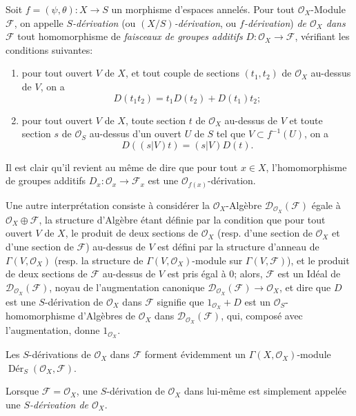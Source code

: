 \begin{env}[16.5.1]
\label{IV.16.5.1}
Soit $f=(\psi,\theta):X\to S$ un morphisme d'espaces annelés. Pour tout
$\mathcal{O}_X$-Module $\mathscr{F}$, on appelle \emph{$S$-dérivation}
(ou \emph{$(X/S)$-dérivation}, ou \emph{$f$-dérivation}) \emph{de
$\mathcal{O}_X$ dans $\mathscr{F}$} tout homomorphisme de \emph{faisceaux de
groupes additifs} $D:\mathcal{O}_X\to\mathscr{F}$, vérifiant les conditions
suivantes:
\begin{enumerate}
\item[(a)] pour tout ouvert $V$ de $X$, et tout couple de sections
$(t_1,t_2)$ de $\mathcal{O}_X$ au-dessus de $V$, on a
\[
  D(t_1t_2)=t_1D(t_2)+D(t_1)t_2;
  \tag{16.5.1.1}
  \label{IV.16.5.1.1}
\]
\item[(b)] pour tout ouvert $V$ de $X$, toute section $t$ de $\mathcal{O}_X$
au-dessus de $V$ et toute section $s$ de $\mathcal{O}_S$ au-dessus d'un ouvert
$U$ de $S$ tel que $V\subset f^{-1}(U)$, on a
\[
  D((s|V)t)=(s|V)D(t).
  \tag{16.5.1.2}
  \label{IV.16.5.1.2}
\]
\end{enumerate}
Il est clair qu'il revient au même de dire que pour tout $x\in X$,
l'homomorphisme de groupes additifs
$D_x:\mathcal{O}_x\to\mathscr{F}_x$ est une
$\mathcal{O}_{f(x)}$-dérivation.

Une autre interprétation consiste à considérer la $\mathcal{O}_X$-Algèbre
$\mathscr{D}_{\mathcal{O}_X}(\mathscr{F})$ égale à
$\mathcal{O}_X\oplus\mathscr{F}$, la structure d'Algèbre étant définie par la
condition que pour tout ouvert $V$ de $X$, le produit de deux sections de
$\mathcal{O}_X$ (resp. d'une section de $\mathcal{O}_X$ et d'une section de
$\mathscr{F}$) au-dessus de $V$ est défini par la structure d'anneau de
$\Gamma(V,\mathcal{O}_X)$ (resp. la structure de
$\Gamma(V,\mathcal{O}_X)$-module sur $\Gamma(V,\mathscr{F})$), et le produit de
deux sections de $\mathscr{F}$ au-dessus de $V$ est pris égal à 0; alors,
$\mathscr{F}$ est un Idéal de
$\mathscr{D}_{\mathcal{O}_X}(\mathscr{F})$, noyau de l'augmentation canonique
$\mathscr{D}_{\mathcal{O}_X}(\mathscr{F})\to\mathcal{O}_X$, et dire que $D$
est une $S$-dérivation de $\mathcal{O}_X$ dans $\mathscr{F}$ signifie que
$1_{\mathcal{O}_X}+D$ est un $\mathcal{O}_S$-homomorphisme d'Algèbres de
$\mathcal{O}_X$ dans $\mathscr{D}_{\mathcal{O}_X}(\mathscr{F})$, qui, composé
avec l'augmentation, donne $1_{\mathcal{O}_X}$.

Les $S$-dérivations de $\mathcal{O}_X$ dans $\mathscr{F}$ forment évidemment
un $\Gamma(X,\mathcal{O}_X)$-module
$\operatorname{Dér}_S(\mathcal{O}_X,\mathscr{F})$.

Lorsque $\mathscr{F}=\mathcal{O}_X$, une $S$-dérivation de $\mathcal{O}_X$ dans
lui-même est simplement appelée une \emph{$S$-dérivation de $\mathcal{O}_X$}.
\end{env}


